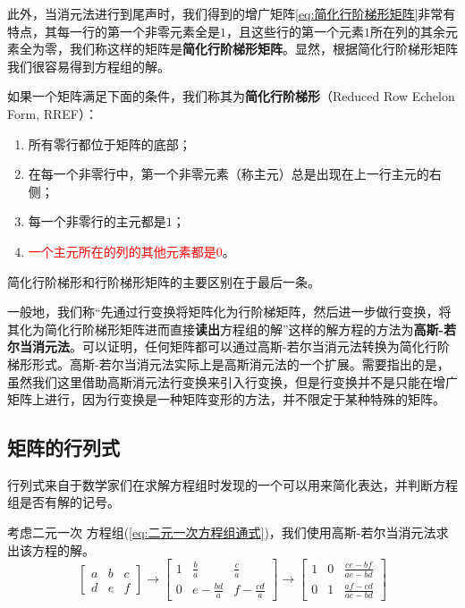 此外，当消元法进行到尾声时，我们得到的增广矩阵\ref{eq:简化行阶梯形矩阵}非常有特点，其每一行的第一个非零元素全是$1$，且这些行的第一个元素$1$所在列的其余元素全为零，我们称这样的矩阵是\textcolor{third}{\bf 简化行阶梯形矩阵}。显然，根据简化行阶梯形矩阵我们很容易得到方程组的解。

\begin{definition}[简化行阶梯形]
    如果一个矩阵满足下面的条件，我们称其为{\bf 简化行阶梯形}（Reduced Row Echelon Form, RREF）：
\begin{enumerate}
    \item 所有零行都位于矩阵的底部；
    \item 在每一个非零行中，第一个非零元素（称主元）总是出现在上一行主元的右侧；
    \item 每一个非零行的主元都是$1$；
    \item \textcolor{red}{一个主元所在的列的其他元素都是$0$}。
\end{enumerate}

简化行阶梯形和行阶梯形矩阵的主要区别在于最后一条。

\end{definition}

一般地，我们称\textcolor{second}{“先通过行变换将矩阵化为行阶梯矩阵，然后进一步做行变换，将其化为简化行阶梯形矩阵进而直接\textbf{读出}方程组的解”}这样的解方程的方法为\textcolor{third}{\bf 高斯-若尔当消元法}。可以证明，任何矩阵都可以通过高斯-若尔当消元法转换为简化行阶梯形形式。高斯-若尔当消元法实际上是高斯消元法的一个扩展。需要指出的是，虽然我们这里借助高斯消元法行变换来引入行变换，但是行变换并不是只能在增广矩阵上进行，因为行变换是一种矩阵变形的方法，并不限定于某种特殊的矩阵。

\subsection{矩阵的行列式}
\label{subsec:矩阵的行列式}

\begin{note}
    行列式来自于数学家们在求解方程组时发现的一个可以用来简化表达，并判断方程组是否有解的记号。
\end{note}

\vspace*{0.3cm}

考虑二元一次    方程组(\ref{eq:二元一次方程组通式})，我们使用高斯-若尔当消元法求出该方程的解。
\begin{equation*}
\left[
\begin{array}{cc|c}
a & b & c \\
d & e & f
\end{array}
\right]
\xrightarrow{}
    \left[
    \begin{array}{cc|c}
1 & \frac{b}{a} & \frac{c}{a} \\
0 & e - \frac{bd}{a} & f - \frac{cd}{a}
\end{array}
\right]
\xrightarrow{}
\left[
\begin{array}{cc|c}
1 & 0 & \frac{ce - bf}{ae - bd} \\
0 & 1 & \frac{af - cd}{ae - bd}
\end{array}
\right]
\end{equation*}

